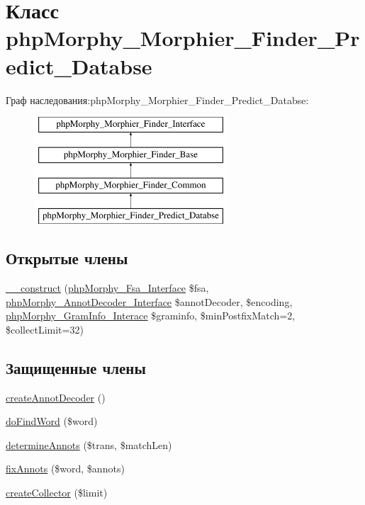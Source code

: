 \hypertarget{classphpMorphy__Morphier__Finder__Predict__Databse}{
\section{Класс phpMorphy\_\-Morphier\_\-Finder\_\-Predict\_\-Databse}
\label{classphpMorphy__Morphier__Finder__Predict__Databse}
}
Граф наследования:phpMorphy\_\-Morphier\_\-Finder\_\-Predict\_\-Databse:\begin{figure}[H]
\begin{center}
\leavevmode
\includegraphics[height=4.000000cm]{classphpMorphy__Morphier__Finder__Predict__Databse}
\end{center}
\end{figure}
\subsection*{Открытые члены}
\begin{DoxyCompactItemize}
\item 
\hyperlink{classphpMorphy__Morphier__Finder__Predict__Databse_ada77076d37a44dd3c7dc8cd4bafc2042}{\_\-\_\-construct} (\hyperlink{interfacephpMorphy__Fsa__Interface}{phpMorphy\_\-Fsa\_\-Interface} \$fsa, \hyperlink{interfacephpMorphy__AnnotDecoder__Interface}{phpMorphy\_\-AnnotDecoder\_\-Interface} \$annotDecoder, \$encoding, \hyperlink{interfacephpMorphy__GramInfo__Interace}{phpMorphy\_\-GramInfo\_\-Interace} \$graminfo, \$minPostfixMatch=2, \$collectLimit=32)
\end{DoxyCompactItemize}
\subsection*{Защищенные члены}
\begin{DoxyCompactItemize}
\item 
\hyperlink{classphpMorphy__Morphier__Finder__Predict__Databse_abe5a606f7cf684fdb0c02045d514cf83}{createAnnotDecoder} ()
\item 
\hyperlink{classphpMorphy__Morphier__Finder__Predict__Databse_ad7818c601f1e949f4660a0424d7ac9a2}{doFindWord} (\$word)
\item 
\hyperlink{classphpMorphy__Morphier__Finder__Predict__Databse_a10c9a996083a057826bf29d6cc75596e}{determineAnnots} (\$trans, \$matchLen)
\item 
\hyperlink{classphpMorphy__Morphier__Finder__Predict__Databse_aa13ced0f3c690f7ba5c82eaedb5b7942}{fixAnnots} (\$word, \$annots)
\item 
\hyperlink{classphpMorphy__Morphier__Finder__Predict__Databse_a91de9400888851f598072db4fcca8054}{createCollector} (\$limit)
\end{DoxyCompactItemize}
